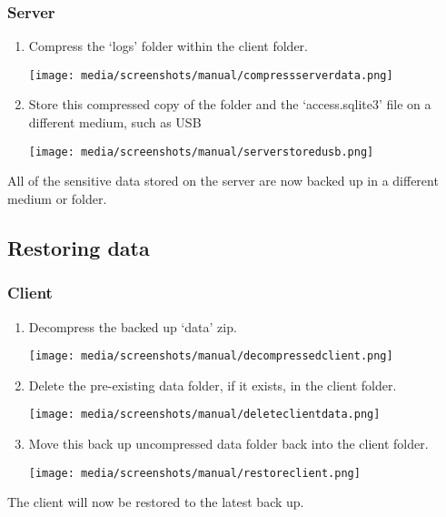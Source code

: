 \documentclass[12pt,a4paper]{report}
\begin{document}
        \subsubsection{Server}
            \begin{enumerate}
                \item Compress the `logs' folder within the client folder.
                \begin{center}
                \texttt{[image: media/screenshots/manual/compressserverdata.png]}
                \end{center}
                \item Store this compressed copy of the folder and the `access.sqlite3' file on a different medium, such as USB
                \begin{center}
                \texttt{[image: media/screenshots/manual/serverstoredusb.png]}
                \end{center}
            \end{enumerate}
            All of the sensitive data stored on the server are now backed up in a different medium or folder.

    \subsection{Restoring data}
        \subsubsection{Client}
            \begin{enumerate}
                \item Decompress the backed up `data' zip.
                \begin{center}
                \texttt{[image: media/screenshots/manual/decompressedclient.png]}
                \end{center}
                \item Delete the pre-existing data folder, if it exists, in the client folder.
                \begin{center}
                \texttt{[image: media/screenshots/manual/deleteclientdata.png]}
                \end{center}
                \item Move this back up uncompressed data folder back into the client folder.
                \begin{center}
                \texttt{[image: media/screenshots/manual/restoreclient.png]}
                \end{center}
            \end{enumerate}
            The client will now be restored to the latest back up.
        \newpage
\end{document}
